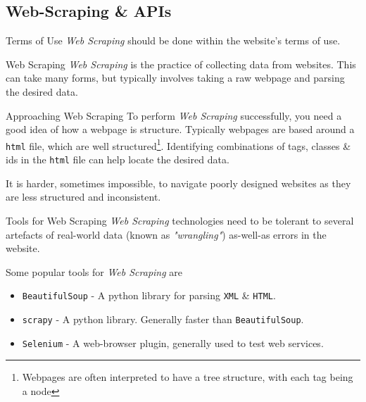 \documentclass[11pt,a4paper]{article}
\begin{document}
\subsection{Web-Scraping \& APIs}

  \begin{remark}{Terms of Use}
    \textit{Web Scraping} should be done within the website's terms of use.
  \end{remark}

  \begin{definition}{Web Scraping}
    \textit{Web Scraping} is the practice of collecting data from websites. This can take many forms, but typically involves taking a raw webpage and parsing the desired data.
  \end{definition}

  \begin{proposition}{Approaching Web Scraping}
    To perform \textit{Web Scraping} successfully, you need a good idea of how a webpage is structure. Typically webpages are based around a \texttt{html} file, which are well structured\footnote{Webpages are often interpreted to have a tree structure, with each tag being a node}. Identifying combinations of tags, classes \& ids in the \texttt{html}  file can help locate the desired data.
    \par It is harder, sometimes impossible, to navigate poorly designed websites as they are less structured and inconsistent.
  \end{proposition}

  \begin{remark}{Tools for Web Scraping}
    \textit{Web Scraping} technologies need to be tolerant to several artefacts of real-world data (known as \textit{"wrangling"}) as-well-as errors in the website.
    \par Some popular tools for \textit{Web Scraping} are
    \begin{itemize}
      \item \texttt{BeautifulSoup} - A python library for parsing \texttt{XML} \& \texttt{HTML}.
      \item \texttt{scrapy} - A python library. Generally faster than \texttt{BeautifulSoup}.
      \item \texttt{Selenium} - A web-browser plugin, generally used to test web services.
    \end{itemize}
  \end{remark}
\end{document}
